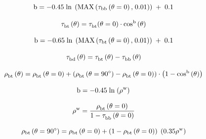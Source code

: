 {\begin{equation}
{\rm{b}} =  - {\rm{0}}{\rm{.45}}\;{\rm{ln}}\;\left( {{\rm{MAX}}\left( {{{\rm{\tau }}_{{\rm{bb}}}}\left( {{\rm{\theta }} = {\rm{0}}} \right){\rm{,}}\;{\rm{0}}{\rm{.01}}} \right)} \right)\; + \;{\rm{0}}{\rm{.1}}
\end{equation}

\begin{equation}
{\rm{\tau }}_{{\rm{bt}}}^{}\left( {\rm{\theta }} \right) = {\rm{\tau }}_{{\rm{bt}}}^{}{\rm{(\theta }} = {\rm{0)}} \cdot {\rm{co}}{{\rm{s}}^{\rm{b}}}\left( {\rm{\theta }} \right)
\end{equation}

\begin{equation}
{\rm{b}} =  - {\rm{0}}{\rm{.65}}\;{\rm{ln}}\;\left( {{\rm{MAX}}\left( {{{\rm{\tau }}_{{\rm{bt}}}}\left( {{\rm{\theta }} = {\rm{0}}} \right){\rm{,}}\;{\rm{0}}{\rm{.01}}} \right)} \right)\; + \;{\rm{0}}{\rm{.1}}
\end{equation}

\begin{equation}
{\rm{\tau }}_{{\rm{bd}}}^{}\left( {\rm{\theta }} \right) = {\rm{\tau }}_{{\rm{bt}}}^{}\left( {\rm{\theta }} \right) - {\rm{\tau }}_{{\rm{bb}}}^{}\left( {\rm{\theta }} \right)
\end{equation}

\begin{equation}
{\rm{\rho }}_{{\rm{bt}}}^{}\left( {\rm{\theta }} \right) = {\rm{\rho }}_{{\rm{bt}}}^{}\left( {{\rm{\theta }} = {\rm{0}}} \right) + \left( {{\rm{\rho }}_{{\rm{bt}}}^{}\left( {{\rm{\theta }} = 9{\rm{0}}^\circ } \right) - {\rm{\rho }}_{{\rm{bt}}}^{}\left( {{\rm{\theta }} = {\rm{0}}} \right)} \right) \cdot \left( {1 - {\rm{co}}{{\rm{s}}^{\rm{b}}}\left( {\rm{\theta }} \right)} \right)
\end{equation}

\begin{equation}
{\rm{b}} =  - {\rm{0}}{\rm{.45}}\;{\rm{ln}}\;{\left( {{{\rm{\rho }}^{\rm{w}}}} \right)^{}}
\end{equation}

\begin{equation}
{\rm{\rho }}_{}^{\rm{w}} = \frac{{{\rm{\rho }}_{{\rm{bt}}}^{}\left( {{\rm{\theta }} = {\rm{0}}} \right)}}{{{\rm{1}} - {\rm{\tau }}_{{\rm{bb}}}^{}\left( {{\rm{\theta }} = {\rm{0}}} \right)}}
\end{equation}

\begin{equation}
{\rho_{{\rm{bt}}}}\left( {{\rm{\theta }} = {\rm{90}}^\circ } \right) = {\rho_{{\rm{bt}}}}\left( {{\rm{\theta }} = {\rm{0}}} \right) + \left( {1 - {\rho_{{\rm{bt}}}}\left( {{\rm{\theta }} = {\rm{0}}} \right)} \right)\;\left( {{\rm{0}}{\rm{.35}}{\rho ^{\rm{w}}}} \right)
\end{equation}

}

